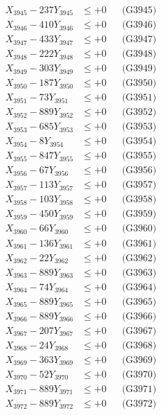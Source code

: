 \documentclass[a4paper,10pt]{article}
\begin{document}
{\begin{align}
X_{3945} - 237Y_{3945} &\leq +0 && \text{(G3945)} \\
X_{3946} - 410Y_{3946} &\leq +0 && \text{(G3946)} \\
X_{3947} - 433Y_{3947} &\leq +0 && \text{(G3947)} \\
X_{3948} - 222Y_{3948} &\leq +0 && \text{(G3948)} \\
X_{3949} - 303Y_{3949} &\leq +0 && \text{(G3949)} \\
X_{3950} - 187Y_{3950} &\leq +0 && \text{(G3950)} \\
\allowbreak
X_{3951} - 73Y_{3951} &\leq +0 && \text{(G3951)} \\
X_{3952} - 889Y_{3952} &\leq +0 && \text{(G3952)} \\
X_{3953} - 685Y_{3953} &\leq +0 && \text{(G3953)} \\
X_{3954} - 8Y_{3954} &\leq +0 && \text{(G3954)} \\
X_{3955} - 847Y_{3955} &\leq +0 && \text{(G3955)} \\
X_{3956} - 67Y_{3956} &\leq +0 && \text{(G3956)} \\
X_{3957} - 113Y_{3957} &\leq +0 && \text{(G3957)} \\
X_{3958} - 103Y_{3958} &\leq +0 && \text{(G3958)} \\
X_{3959} - 450Y_{3959} &\leq +0 && \text{(G3959)} \\
X_{3960} - 66Y_{3960} &\leq +0 && \text{(G3960)} \\
\allowbreak
X_{3961} - 136Y_{3961} &\leq +0 && \text{(G3961)} \\
X_{3962} - 22Y_{3962} &\leq +0 && \text{(G3962)} \\
X_{3963} - 889Y_{3963} &\leq +0 && \text{(G3963)} \\
X_{3964} - 74Y_{3964} &\leq +0 && \text{(G3964)} \\
X_{3965} - 889Y_{3965} &\leq +0 && \text{(G3965)} \\
X_{3966} - 889Y_{3966} &\leq +0 && \text{(G3966)} \\
X_{3967} - 207Y_{3967} &\leq +0 && \text{(G3967)} \\
X_{3968} - 24Y_{3968} &\leq +0 && \text{(G3968)} \\
X_{3969} - 363Y_{3969} &\leq +0 && \text{(G3969)} \\
X_{3970} - 52Y_{3970} &\leq +0 && \text{(G3970)} \\
\allowbreak
X_{3971} - 889Y_{3971} &\leq +0 && \text{(G3971)} \\
X_{3972} - 889Y_{3972} &\leq +0 && \text{(G3972)} \\

\end{align}}
\end{document}
